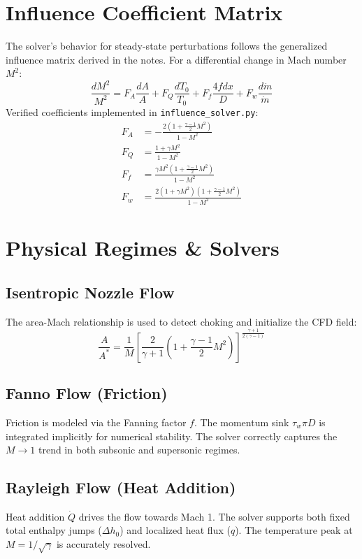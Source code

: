 \documentclass[11pt,a4paper]{article}
\begin{document}
\section{Influence Coefficient Matrix}
The solver's behavior for steady-state perturbations follows the generalized influence matrix derived in the notes. For a differential change in Mach number $M^2$:
\begin{equation}
    \frac{dM^2}{M^2} = F_A \frac{dA}{A} + F_Q \frac{dT_0}{T_0} + F_f \frac{4f dx}{D} + F_w \frac{d\dot{m}}{\dot{m}}
\end{equation}
Verified coefficients implemented in \texttt{influence\_solver.py}:
\begin{align*}
    F_A &= -\frac{2(1 + \frac{\gamma-1}{2}M^2)}{1-M^2} \\
    F_Q &= \frac{1+\gamma M^2}{1-M^2} \\
    F_f &= \frac{\gamma M^2(1+\frac{\gamma-1}{2}M^2)}{1-M^2} \\
    F_w &= \frac{2(1+\gamma M^2)(1+\frac{\gamma-1}{2}M^2)}{1-M^2}
\end{align*}

\section{Physical Regimes \& Solvers}
\subsection{Isentropic Nozzle Flow}
The area-Mach relationship is used to detect choking and initialize the CFD field:
\begin{equation}
    \frac{A}{A^*} = \frac{1}{M} \left[ \frac{2}{\gamma+1} \left( 1 + \frac{\gamma-1}{2}M^2 \right) \right]^{\frac{\gamma+1}{2(\gamma-1)}}
\end{equation}

\subsection{Fanno Flow (Friction)}
Friction is modeled via the Fanning factor $f$. The momentum sink $\tau_w \pi D$ is integrated implicitly for numerical stability. The solver correctly captures the $M \to 1$ trend in both subsonic and supersonic regimes.

\subsection{Rayleigh Flow (Heat Addition)}
Heat addition $\dot{Q}$ drives the flow towards Mach 1. The solver supports both fixed total enthalpy jumps ($\Delta h_0$) and localized heat flux ($q$). The temperature peak at $M = 1/\sqrt{\gamma}$ is accurately resolved.
\end{document}
